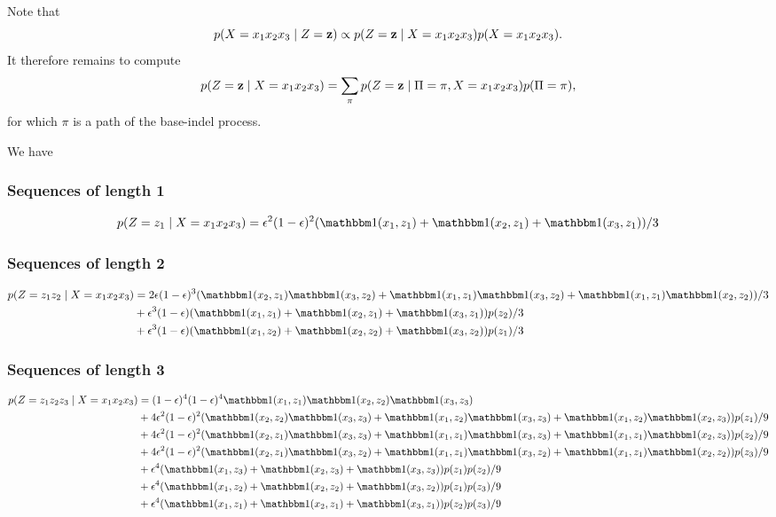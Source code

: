 Note that
\begin{equation*}
  p(X=x_1x_2x_3 \;|\; Z=\mathbf{z}) \propto p(Z=\mathbf{z} \;|\; X=x_1x_2x_3) p(X=x_1x_2x_3).
\end{equation*}
It therefore remains to compute
\begin{equation*}
  p(Z=\mathbf{z} \;|\; X=x_1x_2x_3) = \sum_{\pi}p(Z=\mathbf{z} \;|\; \Pi=\pi, X=x_1x_2x_3) p(\Pi=\pi),
\end{equation*}
for which $\pi$ is a path of the base-indel process.

We have

\subsubsection{Sequences of length 1}

\begin{equation*}
  p(Z=z_1 \gv X=x_1x_2x_3) = \e^2(1-\e)^2(\I(x_1, z_1) + \I(x_2, z_1) + \I(x_3, z_1))/3
\end{equation*}

\subsubsection{Sequences of length 2}

\begin{equation*}
  \begin{split}
    p(Z=z_1z_2 \gv X=x_1x_2x_3)
        &= 2\e(1-\e)^3(\I(x_2, z_1)\I(x_3, z_2) + \I(x_1, z_1)\I(x_3, z_2) + \I(x_1, z_1)\I(x_2, z_2))/3\\
        &+ \e^3(1-\e)(\I(x_1, z_1) + \I(x_2, z_1) + \I(x_3, z_1))p(z_2)/3\\
        &+ \e^3(1-\e)(\I(x_1, z_2) + \I(x_2, z_2) + \I(x_3, z_2))p(z_1)/3
  \end{split}
\end{equation*}

\subsubsection{Sequences of length 3}

\begin{equation*}
  \begin{split}
    p(Z=z_1z_2z_3 \gv X=x_1x_2x_3) &= (1-\e)^4 (1-\e)^4\I(x_1, z_1)\I(x_2, z_2)\I(x_3, z_3)\\
        &+ 4\e^2(1-\e)^2 (\I(x_2, z_2)\I(x_3, z_3) + \I(x_1, z_2)\I(x_3, z_ 3) + \I(x_1, z_2)\I(x_2, z_3)) p(z_1)/9\\
        &+ 4\e^2(1-\e)^2 (\I(x_2, z_1)\I(x_3, z_3) + \I(x_1, z_1)\I(x_3, z_3) + \I(x_1, z_1)\I(x_2, z_3))p(z_2)/9\\
        &+ 4\e^2(1-\e)^2 (\I(x_2, z_1)\I(x_3, z_2) + \I(x_1, z_1)\I(x_3, z_2) + \I(x_1, z_1)\I(x_2, z_2))p(z_3)/9\\
        &+ \e^4 (\I(x_1, z_3) + \I(x_2, z_3) + \I(x_3, z_3))p(z_1)p(z_2)/9\\
        &+ \e^4 (\I(x_1, z_2) + \I(x_2, z_2) + \I(x_3, z_2))p(z_1)p(z_3)/9\\
        &+ \e^4 (\I(x_1, z_1) + \I(x_2, z_1) + \I(x_3, z_1))p(z_2)p(z_3)/9
  \end{split}
\end{equation*}

